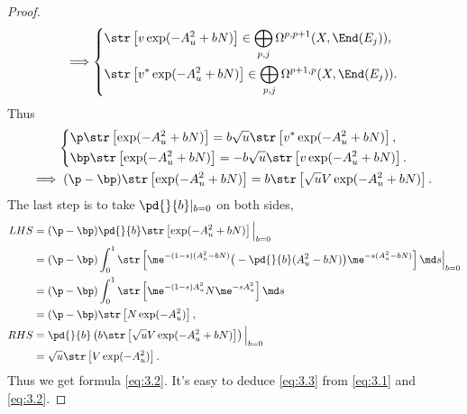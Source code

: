 \begin{proof}
\begin{gather*}
        \Longrightarrow
        \left\{
            \begin{aligned}
                &\str\left[v\exp(-A_u^2+bN)\right] \in 
                \bigoplus_{p,j}\Omega^{p,p+1}(X,\End(E_j)), \\
                &\str\left[v^*\exp(-A_u^2+bN)\right] \in 
                \bigoplus_{p,j}\Omega^{p+1,p}(X,\End(E_j)).
            \end{aligned}
        \right.
    \end{gather*}
    Thus
    \begin{gather*}
        \left\{
            \begin{aligned}
            &\p\str\left[\exp(-A_u^2+bN)\right] 
            = b\sqrt{u}\str\left[v^*\exp(-A_u^2+bN)\right], \\
            &\bp\str\left[\exp(-A_u^2+bN)\right] 
            = -b\sqrt{u}\str\left[v\exp(-A_u^2+bN)\right].
            \end{aligned}
        \right. \\
        \Longrightarrow\;
        (\p-\bp)\str\left[\exp(-A_u^2+bN)\right]
        = b\str\left[\sqrt{u}V\exp(-A_u^2+bN)\right].
    \end{gather*}
    The last step is to take $\pd{}{b}|_{b=0}$ on both sides, 
    \begin{align*}
        LHS &= (\p-\bp)\pd{}{b}\str\left[\exp(-A_u^2+bN)\right]\Big|_{b=0} \\
        &= (\p-\bp)\int_0^1\str\left[\me^{-(1-s)(A_u^2-bN)}
        \big(-\pd{}{b}(A_u^2-bN)\big)\me^{-s(A_u^2-bN)} \right]\md s\Big|_{b=0} \\
        &= (\p-\bp)\int_0^1\str\left[\me^{-(1-s)A_u^2}N\me^{-sA_u^2}\right]\md s \\
        &= (\p-\bp)\str\left[N\exp(-A_u^2)\right], \\
        RHS &= \pd{}{b}\left(b\str\left[\sqrt{u}V\exp(-A_u^2+bN)\right]\right)\Big|_{b=0} \\
        &= \sqrt{u}\str\left[V\exp(-A_u^2)\right].            
    \end{align*}
    Thus we get formula \eqref{eq:3.2}. It's easy to deduce \eqref{eq:3.3} 
    from \eqref{eq:3.1} and \eqref{eq:3.2}.
    \end{proof}
